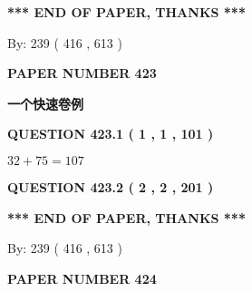 \documentclass{ctexart}
\begin{document}
   
   
\vspace{1.0in} 
{\textbf{\large{ *** END OF PAPER, THANKS *** }}} 
   
   
\hspace{1.0in} By: 
 239 ( 416 ,  613 )
   
   
   
   
\newpage 
\setcounter{page}{ 
   423001 } 
   
   
   
   
 {\textbf{ \Large{ PAPER NUMBER  423  }}}
   
   
\vspace{0.2in}
   
   
   
   
   
   
 \vspace{0.2in}
{\LARGE {\textbf{ 一个快速卷例}}}
   
   
  
\vspace{0.2in}
  
{\textbf{\Large{QUESTION
423.1 
 ( 1 , 1 , 101 )
}}}
  
  
 
 

$ %
32 +  %
75=   %
107$
 
 
  
\vspace{0.2in}
  
{\textbf{\Large{QUESTION
423.2 
 ( 2 , 2 , 201 )
}}}
  
  
   
   
 \vspace{0.2in}
 
   
   
   
   
\vspace{1.0in} 
{\textbf{\large{ *** END OF PAPER, THANKS *** }}} 
   
   
\hspace{1.0in} By: 
 239 ( 416 ,  613 )
   
   
   
   
\newpage 
\setcounter{page}{ 
   424001 } 
   
   
   
   
 {\textbf{ \Large{ PAPER NUMBER  424  }}}
   
   
\vspace{0.2in}
   
\end{document}
